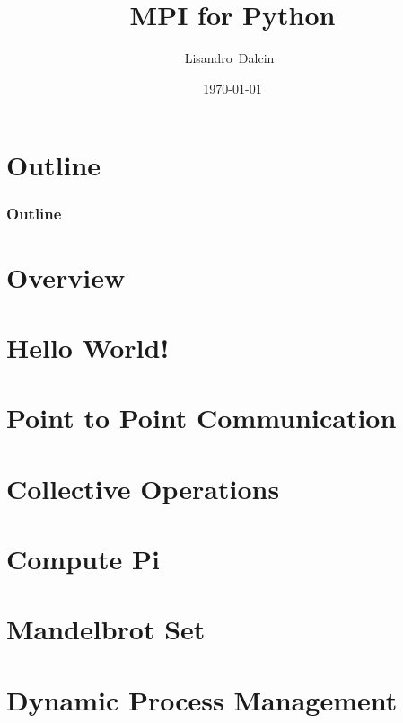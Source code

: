 \documentclass{beamer}
\title[mpi4py]{MPI for Python}
\subtitle{\myurl{http://mpi4py.scipy.org}}
\author[L.~Dalcin]{Lisandro~Dalcin~\\\email{dalcinl@gmail.com}}
\institute[]
{
  Extreme Computing Research Center \\
  King Abdullah University of Science and Technology\\
  Thuwal, Saudi Arabia
}
\date[]
{
  \today
}
\begin{document}
\begin{frame}
  \titlepage
\end{frame}

\section*{Outline}
\begin{frame}
  \frametitle{Outline}
  \tableofcontents
\end{frame}


\section{Overview}



\section{Hello World!}



% 


\section{Point to Point Communication}



\section{Collective Operations}



\section{Compute Pi}



\section{Mandelbrot Set}



\section{Dynamic Process Management}

\end{document}
